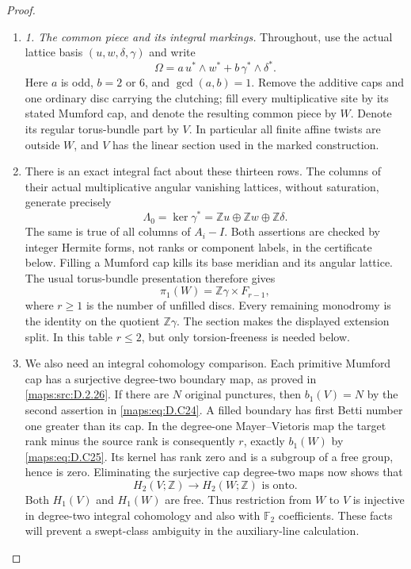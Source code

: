 \begin{proof}
\begin{enumerate}[label=\arabic*.,leftmargin=*]
\item \emph{1. The common piece and its integral markings.}
Throughout, use the actual lattice basis $(u,w,\delta,\gamma)$ and
write
\[
 \Omega=a\,u^*\wedge w^*+b\,\gamma^*\wedge\delta^*.
                                                               \tag{D.C23}\label{maps:eq:D.C23}
\]
Here $a$ is odd, $b=2$ or $6$, and $\gcd(a,b)=1$.
Remove the additive caps and one ordinary disc carrying the clutching;
fill every multiplicative site by its stated Mumford cap, and denote
the resulting common piece by $W$. Denote its regular torus-bundle
part by $V$. In particular all finite affine twists are outside $W$,
and $V$ has the linear section used in the marked construction.

\item There is an exact integral fact about these thirteen rows. The columns
of their actual multiplicative angular vanishing lattices, without
saturation, generate precisely
\[
 \Lambda_0=\ker\gamma^*=\mathbb Zu\oplus\mathbb Zw
                    \oplus\mathbb Z\delta.                    \tag{D.C24}\label{maps:eq:D.C24}
\]
The same is true of all columns of $A_i-I$. Both assertions are checked
by integer Hermite forms, not ranks or component labels, in the
certificate below. Filling a Mumford cap kills its base meridian and
its angular lattice. The usual torus-bundle presentation therefore
gives
\[
 \pi_1(W)=\mathbb Z\gamma\times F_{r-1},
                                                               \tag{D.C25}\label{maps:eq:D.C25}
\]
where $r\ge1$ is the number of unfilled discs. Every remaining
monodromy is the identity on the quotient $\mathbb Z\gamma$.
The section makes the displayed extension split. In this table
$r\le2$, but only torsion-freeness is needed below.

\item We also need an integral cohomology comparison. Each primitive
Mumford cap has a surjective degree-two boundary map, as proved in
\ref{maps:src:D.2.26}. If there are $N$ original punctures, then $b_1(V)=N$ by the
second assertion in \eqref{maps:eq:D.C24}. A filled boundary has first Betti number
one greater than its cap. In the degree-one Mayer--Vietoris map the
target rank minus the source rank is consequently $r$, exactly
$b_1(W)$ by \eqref{maps:eq:D.C25}. Its kernel has rank zero and is a subgroup of a
free group, hence is zero. Eliminating the surjective cap degree-two
maps now shows that
\[
 H_2(V;\mathbb Z)\longrightarrow H_2(W;\mathbb Z)
                  \text{ is onto}.                            \tag{D.C26}\label{maps:eq:D.C26}
\]
Both $H_1(V)$ and $H_1(W)$ are free. Thus restriction from $W$ to $V$
is injective in degree-two integral cohomology and also with
$\mathbb F_2$ coefficients. These facts will prevent a swept-class
ambiguity in the auxiliary-line calculation.


\end{enumerate}
\end{proof}

